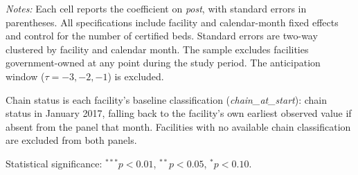 \documentclass[11pt]{article}
\begin{document}
\begin{table}[!ht]
\begin{threeparttable}
\begin{tablenotes}[flushleft]
\footnotesize
\item \textit{Notes:} Each cell reports the coefficient on \textit{post}, with standard errors in parentheses. All specifications include facility and calendar-month fixed effects and control for the number of certified beds. Standard errors are two-way clustered by facility and calendar month. The sample excludes facilities government-owned at any point during the study period. The anticipation window ($\tau = -3, -2, -1$) is excluded.
\item Chain status is each facility's baseline classification (\textit{chain\_at\_start}): chain status in January 2017, falling back to the facility's own earliest observed value if absent from the panel that month. Facilities with no available chain classification are excluded from both panels.
\item Statistical significance: $^{***}p<0.01$, $^{**}p<0.05$, $^{*}p<0.10$.
\end{tablenotes}

\end{threeparttable}
\end{table}
\clearpage
\end{document}
